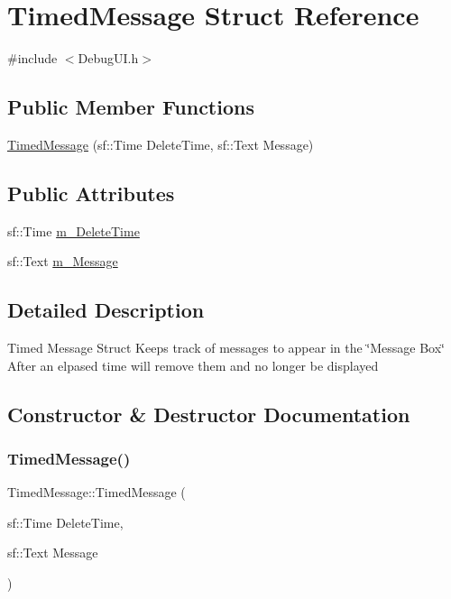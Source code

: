 \hypertarget{struct_timed_message}{}\section{Timed\+Message Struct Reference}
\label{struct_timed_message}


{\ttfamily \#include $<$Debug\+U\+I.\+h$>$}

\subsection*{Public Member Functions}
\begin{DoxyCompactItemize}
\item 
\hyperlink{struct_timed_message_a334e9763f0d15d5417e482bfc9a5a49f}{Timed\+Message} (sf\+::\+Time Delete\+Time, sf\+::\+Text Message)
\end{DoxyCompactItemize}
\subsection*{Public Attributes}
\begin{DoxyCompactItemize}
\item 
sf\+::\+Time \hyperlink{struct_timed_message_a9fcb14f06f9ea20e38b4df8d3cbe210b}{m\+\_\+\+Delete\+Time}
\item 
sf\+::\+Text \hyperlink{struct_timed_message_a139ff1ef0877da4e0033147886241509}{m\+\_\+\+Message}
\end{DoxyCompactItemize}


\subsection{Detailed Description}
Timed Message Struct Keeps track of messages to appear in the \char`\"{}\+Message Box\char`\"{} After an elpased time will remove them and no longer be displayed 

\subsection{Constructor \& Destructor Documentation}
\hypertarget{struct_timed_message_a334e9763f0d15d5417e482bfc9a5a49f}{}\label{struct_timed_message_a334e9763f0d15d5417e482bfc9a5a49f} 
\subsubsection{\texorpdfstring{Timed\+Message()}{TimedMessage()}}
{\footnotesize\ttfamily Timed\+Message\+::\+Timed\+Message (\begin{DoxyParamCaption}\item[{sf\+::\+Time}]{Delete\+Time,  }\item[{sf\+::\+Text}]{Message }\end{DoxyParamCaption})\hspace{0.3cm}{\ttfamily [inline]}}



